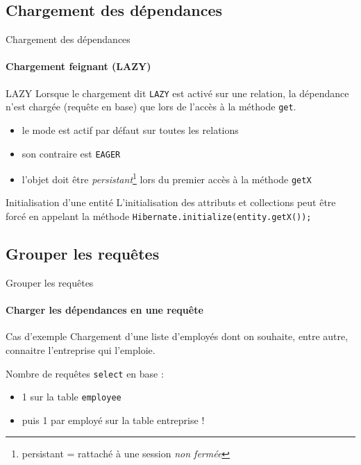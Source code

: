 \documentclass[compress]{beamer}%
\begin{document}
\subsection{Chargement des dépendances}
\begin{frame}{Chargement des dépendances}
	\framesubtitle{Chargement feignant (LAZY)}
	
	\begin{block}{LAZY}
	Lorsque le chargement dit \texttt{LAZY} est activé sur une relation, la dépendance n'est chargée (requête en base) que lors de l'accès à la méthode \texttt{get}.
	\end{block}
	
	\pause
	\begin{itemize}
	\item le mode est actif par défaut sur toutes les relations
	\item son contraire est \texttt{EAGER}
	\item l'objet doit être \emph{persistant}\footnote{persistant = rattaché à une session \emph{non fermée}} lors du premier accès à la méthode \texttt{getX}
	\end{itemize}
	
	\pause	
	\begin{block}{Initialisation d'une entité}
	L'initialisation des attributs et collections peut être forcé en appelant la méthode \texttt{Hibernate.initialize(entity.getX());}
	\end{block}
\end{frame}

\subsection{Grouper les requêtes}
\begin{frame}[fragile]{Grouper les requêtes}
	\framesubtitle{Charger les dépendances en une requête}
	
	\begin{exampleblock}{Cas d'exemple}	
	Chargement d'une liste d'employés dont on souhaite, entre autre, connaitre l'entreprise qui l'emploie.
	\end{exampleblock}
	
	\pause
	Nombre de requêtes \texttt{select} en base :
	\begin{itemize}
	\item 1 sur la table \texttt{employee}
	\item puis 1 par employé sur la table entreprise !
	\end{itemize}

\end{frame}
\end{document}
